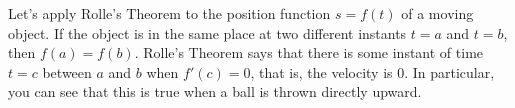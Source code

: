 \documentclass{book}
\begin{document}

%
%
%

\begin{Exam} Let's apply Rolle's Theorem to the position function $s=f(t)$ of a moving object. If the object is in the same place at two different instants $t=a$ and $t=b$, then $f(a) =f(b)$. Rolle's Theorem says that there is some instant of time $t=c$ between $a$ and $b$ when $f'(c) = 0$, that is, the velocity is 0. In particular, you can see that this is true when a ball is thrown directly upward. 
\end{Exam}\vs
\end{document}
